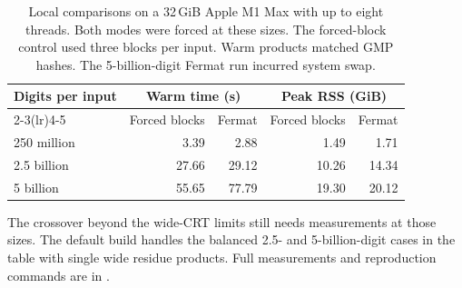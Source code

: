 \begin{table}[H]
\centering
\small
\begin{tabular}{lrrrr}
\toprule
Digits per input & \multicolumn{2}{c}{Warm time (s)} & \multicolumn{2}{c}{Peak RSS (GiB)} \\
\cmidrule(lr){2-3}\cmidrule(lr){4-5}
& Forced blocks & Fermat & Forced blocks & Fermat \\
\midrule
250 million & 3.39 & 2.88 & 1.49 & 1.71 \\
2.5 billion & 27.66 & 29.12 & 10.26 & 14.34 \\
5 billion & 55.65 & 77.79 & 19.30 & 20.12 \\
\bottomrule
\end{tabular}
\caption{Local comparisons on a 32\,GiB Apple M1 Max with up to eight
threads. Both modes were forced at these sizes. The forced-block control used
three blocks per input. Warm products matched GMP hashes. The 5-billion-digit
Fermat run incurred system swap.}
\end{table}

The crossover beyond the wide-CRT limits still needs measurements at
those sizes. The default build handles the balanced 2.5- and 5-billion-digit
cases in the table with single wide residue products. Full measurements and
reproduction commands are in .
